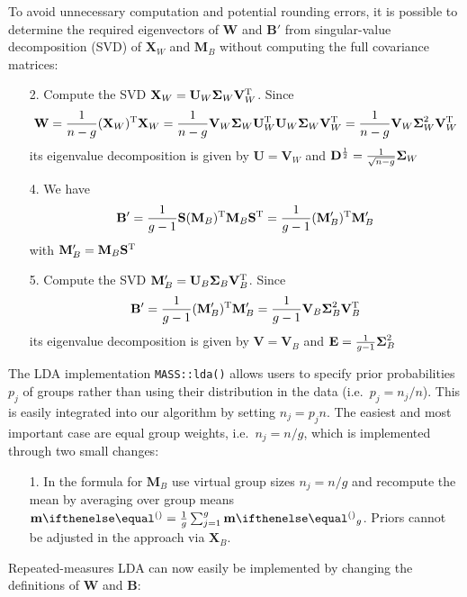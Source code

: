 \documentclass[a4paper]{article}
\begin{document}
To avoid unnecessary computation and potential rounding errors, it is possible to determine the required eigenvectors of $\mathbf{W}$ and $\mathbf{B}'$ from singular-value decomposition (SVD) of $\mathbf{X}_W$ and $\mathbf{M}_B$ without computing the full covariance matrices:

\begin{itemize}
\item[2.] Compute the SVD $\mathbf{X}_W = \mathbf{U}_W \boldsymbol{\Sigma}_W \mathbf{V}_W^{\text{T}}$. Since
  \[
    \mathbf{W} = \frac1{n - g} (\mathbf{X}_W)^{\text{T}} \mathbf{X}_W
    = \frac1{n - g} \mathbf{V}_W \boldsymbol{\Sigma}_W \mathbf{U}_W^{\text{T}} \mathbf{U}_W \boldsymbol{\Sigma}_W \mathbf{V}_W^{\text{T}}
    = \frac1{n - g} \mathbf{V}_W \boldsymbol{\Sigma}_W^2 \mathbf{V}_W^{\text{T}}
  \]
  its eigenvalue decomposition is given by $\mathbf{U} = \mathbf{V}_W$ and $\mathbf{D}^{\frac12} = \frac1{\sqrt{n - g}} \boldsymbol{\Sigma}_W$
\item[4.] We have
  \[
    \mathbf{B}' = \frac1{g - 1} \mathbf{S} (\mathbf{M}_B)^{\text{T}} \mathbf{M}_B \mathbf{S}^{\text{T}}
     = \frac1{g - 1} (\mathbf{M}_B')^{\text{T}} \mathbf{M}_B'
   \]
   with $\mathbf{M}_B' = \mathbf{M}_B \mathbf{S}^{\text{T}}$
\item[5.] Compute the SVD $\mathbf{M}_B' = \mathbf{U}_{B} \boldsymbol{\Sigma}_{B} \mathbf{V}_B^{\text{T}}$. Since
  \[
    \mathbf{B}' = \frac1{g - 1} (\mathbf{M}_B')^{\text{T}} \mathbf{M}_B'
    = \frac1{g - 1} \mathbf{V}_B \boldsymbol{\Sigma}_B^2 \mathbf{V}_B^{\text{T}}
  \]
  its eigenvalue decomposition is given by $\mathbf{V} = \mathbf{V}_B$ and $\mathbf{E} = \frac1{g - 1} \boldsymbol{\Sigma}_B^2$
\end{itemize}

The LDA implementation \texttt{MASS::lda()} allows users to specify prior probabilities $p_j$ of groups rather than using their distribution in the data (i.e.\ $p_j = n_j / n$). This is easily integrated into our algorithm by setting $n_j = p_j n$. The easiest and most important case are equal group weights, i.e.\ $n_j = n / g$, which is implemented through two small changes:

\begin{enumerate}
\item[1.] In the formula for $\mathbf{M}_B$ use virtual group sizes $n_j = n / g$ and recompute the mean by averaging over group means $\vm = \frac1g \sum_{j=1}^g \vm_g$. Priors cannot be adjusted in the approach via $\mathbf{X}_B$.
\end{enumerate}

Repeated-measures LDA can now easily be implemented by changing the definitions of $\mathbf{W}$ and $\mathbf{B}$:
\end{document}
